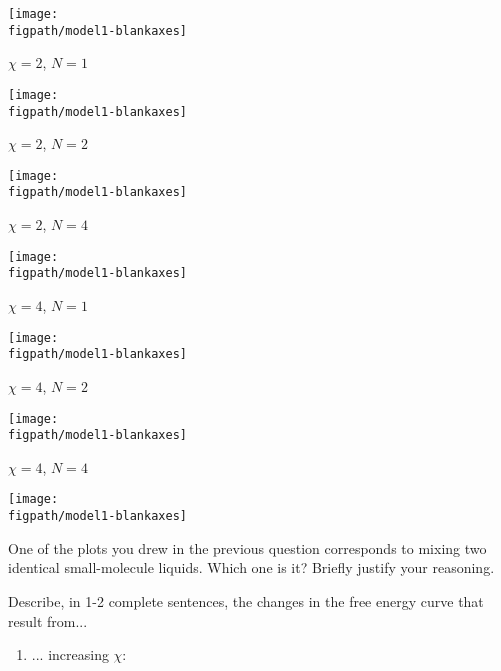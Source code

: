 \begin{activity}
\begin{ctqs}
\begin{minipage}{0.3\textwidth}
			\centerline{\texttt{[image: \\figpath/model1-blankaxes]}}
		\end{minipage}
	
		\vspace{0.1in}
		\begin{minipage}{0.3\textwidth}
			\centerline{$\chi = 2$, $N = 1$}
			
			\centerline{\texttt{[image: \\figpath/model1-blankaxes]}}
		\end{minipage}
		\begin{minipage}{0.3\textwidth}
			\centerline{$\chi = 2$, $N = 2$}
			
			\centerline{\texttt{[image: \\figpath/model1-blankaxes]}}
		\end{minipage}
		\begin{minipage}{0.3\textwidth}
			\centerline{$\chi = 2$, $N = 4$}
			
			\centerline{\texttt{[image: \\figpath/model1-blankaxes]}}
		\end{minipage}
	
		\vspace{0.1in}
		\begin{minipage}{0.3\textwidth}
			\centerline{$\chi = 4$, $N = 1$}
			
			\centerline{\texttt{[image: \\figpath/model1-blankaxes]}}
		\end{minipage}
		\begin{minipage}{0.3\textwidth}
			\centerline{$\chi = 4$, $N = 2$}
			
			\centerline{\texttt{[image: \\figpath/model1-blankaxes]}}
		\end{minipage}
		\begin{minipage}{0.3\textwidth}
			\centerline{$\chi = 4$, $N = 4$}
			
			\centerline{\texttt{[image: \\figpath/model1-blankaxes]}}
		\end{minipage}
	
	\question One of the plots you drew in the previous question corresponds to mixing two identical small-molecule liquids.  Which one is it?  Briefly justify your reasoning.
	
		\begin{solution}[2in]
		\end{solution}
	
	\question Describe, in 1-2 complete sentences, the changes in the free energy curve that result from...
		\begin{enumerate}
			\item ... increasing $\chi$:
	

\end{enumerate}
\end{ctqs}
\end{activity}
